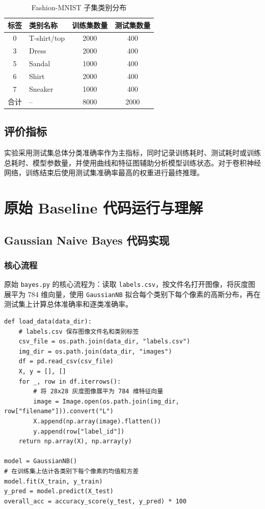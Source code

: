 \documentclass[UTF8]{ctexart}
\begin{document}
\begin{table}[H]
\centering
\caption{Fashion-MNIST 子集类别分布}
\begin{tabular}{clcc}
\toprule
标签 & 类别名称 & 训练集数量 & 测试集数量\\
\midrule
0 & T-shirt/top & 2000 & 400\\
3 & Dress & 2000 & 400\\
5 & Sandal & 1000 & 400\\
6 & Shirt & 2000 & 400\\
7 & Sneaker & 1000 & 400\\
\midrule
合计 & -- & 8000 & 2000\\
\bottomrule
\end{tabular}
\end{table}

\subsection{评价指标}

实验采用测试集总体分类准确率作为主指标，同时记录训练耗时、测试耗时或训练总耗时、模型参数量，并使用曲线和特征图辅助分析模型训练状态。对于卷积神经网络，训练结束后使用测试集准确率最高的权重进行最终推理。

\section{原始 Baseline 代码运行与理解}

\subsection{Gaussian Naive Bayes 代码实现}

\subsubsection{核心流程}

原始 \texttt{bayes.py} 的核心流程为：读取 \texttt{labels.csv}，按文件名打开图像，将灰度图展平为 784 维向量，使用 \texttt{GaussianNB} 拟合每个类别下每个像素的高斯分布，再在测试集上计算总体准确率和逐类准确率。

\begin{lstlisting}[caption={原始 GaussianNB baseline 的核心逻辑}]
def load_data(data_dir):
    # labels.csv 保存图像文件名和类别标签
    csv_file = os.path.join(data_dir, "labels.csv")
    img_dir = os.path.join(data_dir, "images")
    df = pd.read_csv(csv_file)
    X, y = [], []
    for _, row in df.iterrows():
        # 将 28x28 灰度图像展平为 784 维特征向量
        image = Image.open(os.path.join(img_dir, row["filename"])).convert("L")
        X.append(np.array(image).flatten())
        y.append(row["label_id"])
    return np.array(X), np.array(y)

model = GaussianNB()
# 在训练集上估计各类别下每个像素的均值和方差
model.fit(X_train, y_train)
y_pred = model.predict(X_test)
overall_acc = accuracy_score(y_test, y_pred) * 100
\end{lstlisting}
\end{document}
